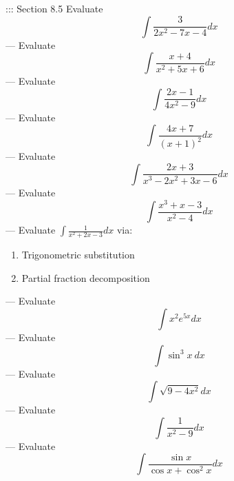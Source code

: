 ::: Section 8.5
Evaluate
\[\int\frac{3}{2x^2-7x-4}dx\]
---
Evaluate
\[\int\frac{x+4}{x^2+5x+6}dx\]
---
Evaluate
\[\int\frac{2x-1}{4x^2-9}dx\]
---
Evaluate
\[\int\frac{4x+7}{(x+1)^2}dx\]
---
Evaluate
\[\int\frac{2x+3}{x^3-2x^2+3x-6}dx\]
---
Evaluate
\[\int\frac{x^3+x-3}{x^2-4}dx\]
---
Evaluate \(\displaystyle\int\frac{1}{x^2+2x-3}dx\) via:
\begin{enumerate}
\item Trigonometric substitution
\item Partial fraction decomposition
\end{enumerate}
---
Evaluate
\[\int x^2e^{5x}dx\]
---
Evaluate
\[\int\sin^3 x\ dx\]
---
Evaluate
\[\int\sqrt{9-4x^2}dx\]
---
Evaluate
\[\int\frac{1}{x^2-9}dx\]
---
Evaluate
\[\int\frac{\sin x}{\cos x+\cos^2 x}dx\]
